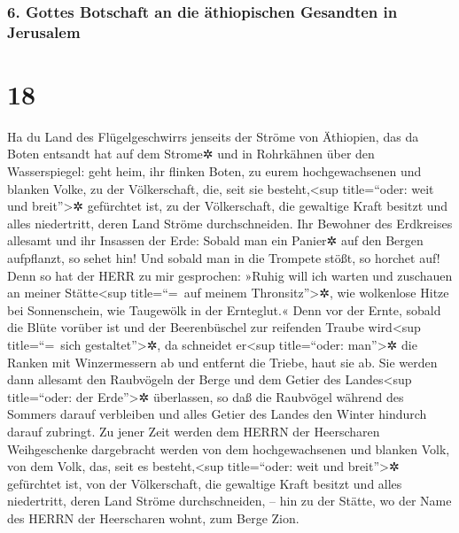 \hypertarget{gottes-botschaft-an-die-uxe4thiopischen-gesandten-in-jerusalem}{%
\subsubsection{6. Gottes Botschaft an die äthiopischen Gesandten in
Jerusalem}\label{gottes-botschaft-an-die-uxe4thiopischen-gesandten-in-jerusalem}}

\hypertarget{section-17}{%
\section{18}\label{section-17}}

Ha du Land des Flügelgeschwirrs jenseits der Ströme von
Äthiopien, das da Boten entsandt hat auf dem Strome✲ und
in Rohrkähnen über den Wasserspiegel: geht heim, ihr flinken Boten, zu
eurem hochgewachsenen und blanken Volke, zu der Völkerschaft, die, seit
sie besteht,\textless sup title=``oder: weit und breit''\textgreater✲
gefürchtet ist, zu der Völkerschaft, die gewaltige Kraft besitzt und
alles niedertritt, deren Land Ströme durchschneiden. Ihr
Bewohner des Erdkreises allesamt und ihr Insassen der Erde: Sobald man
ein Panier✲ auf den Bergen aufpflanzt, so sehet hin! Und sobald man in
die Trompete stößt, so horchet auf! Denn so hat der HERR
zu mir gesprochen: »Ruhig will ich warten und zuschauen an meiner
Stätte\textless sup title=``=~auf meinem Thronsitz''\textgreater✲, wie
wolkenlose Hitze bei Sonnenschein, wie Taugewölk in der Ernteglut.«
Denn vor der Ernte, sobald die Blüte vorüber ist und der
Beerenbüschel zur reifenden Traube wird\textless sup title=``=~sich
gestaltet''\textgreater✲, da schneidet er\textless sup title=``oder:
man''\textgreater✲ die Ranken mit Winzermessern ab und entfernt die
Triebe, haut sie ab. Sie werden dann allesamt den
Raubvögeln der Berge und dem Getier des Landes\textless sup
title=``oder: der Erde''\textgreater✲ überlassen, so daß die Raubvögel
während des Sommers darauf verbleiben und alles Getier des Landes den
Winter hindurch darauf zubringt. Zu jener Zeit werden dem
HERRN der Heerscharen Weihgeschenke dargebracht werden von dem
hochgewachsenen und blanken Volk, von dem Volk, das, seit es
besteht,\textless sup title=``oder: weit und breit''\textgreater✲
gefürchtet ist, von der Völkerschaft, die gewaltige Kraft besitzt und
alles niedertritt, deren Land Ströme durchschneiden, -- hin zu der
Stätte, wo der Name des HERRN der Heerscharen wohnt, zum Berge Zion.

